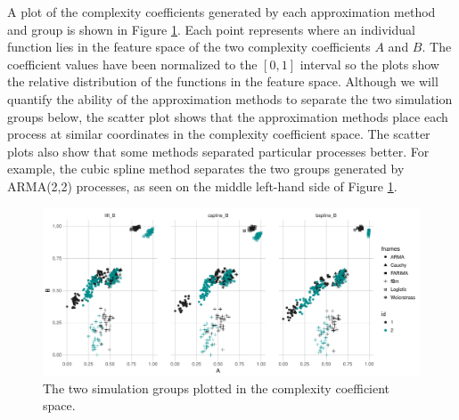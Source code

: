 A plot of the complexity coefficients generated by each approximation method and group is shown in Figure \ref{fig:feature-space}. Each point represents where an individual function lies in the feature space of the two complexity coefficients $A$ and $B$. The coefficient values have been normalized to the $[0,1]$ interval so the plots show the relative distribution of the functions in the feature space.
Although we will quantify 
the ability of the approximation methods to 
separate the two simulation groups below, the scatter plot shows that the approximation methods place each process at similar coordinates in the 
complexity coefficient space. The scatter plots also show 
that some methods separated particular processes better. 
For example, the cubic spline method separates the two groups 
generated by ARMA(2,2) processes, as seen on the middle left-hand side of Figure \ref{fig:feature-space}.


\begin{figure}[!htbp]
  \begin{center}
  \includegraphics[width = \textwidth, keepaspectratio]{./figs/ecomplex_approx-feature-space.pdf}
  \end{center}
  \caption{The two simulation groups plotted in the 
  complexity coefficient space.}
  \label{fig:feature-space} 
\end{figure}


